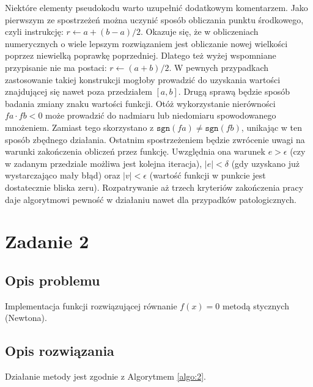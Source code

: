 \documentclass{classrep}
\begin{document}
		Niektóre elementy pseudokodu warto uzupełnić dodatkowym komentarzem. Jako pierwszym ze spostrzeżeń można uczynić sposób obliczania punktu środkowego, czyli instrukcję: $r \leftarrow a+(b-a)/2$. Okazuje się, że w obliczeniach numerycznych o wiele lepszym rozwiązaniem jest obliczanie nowej wielkości poprzez niewielką poprawkę poprzedniej. Dlatego też wyżej wspomniane przypisanie nie ma postaci: $r \leftarrow (a+b)/2$. W pewnych przypadkach zastosowanie takiej konstrukcji mogłoby prowadzić do uzyskania wartości znajdującej się nawet poza przedziałem $[a,b]$.
		Drugą sprawą będzie sposób badania zmiany znaku wartości funkcji. Otóż wykorzystanie nierówności $fa\cdot fb < 0$ może prowadzić do nadmiaru lub niedomiaru spowodowanego mnożeniem. Zamiast tego skorzystano z $\texttt{sgn}(fa) \neq \texttt{sgn}(fb)$, unikając w ten sposób zbędnego działania.
		Ostatnim spostrzeżeniem będzie zwrócenie uwagi na warunki zakończenia obliczeń przez funkcję. Uwzględnia ona warunek $e > \epsilon$ (czy w zadanym przedziale możliwa jest kolejna iteracja), $|e| < \delta$ (gdy uzyskano już wystarczająco mały błąd) oraz $|v| < \epsilon$ (wartość funkcji w punkcie jest dostatecznie bliska zeru). Rozpatrywanie aż trzech kryteriów zakończenia pracy daje algorytmowi pewność w działaniu nawet dla przypadków patologicznych.
	
\section{Zadanie 2}
	\subsection{Opis problemu}
		Implementacja funkcji rozwiązującej równanie $f(x)=0$ metodą stycznych (Newtona).
		
	\subsection{Opis rozwiązania}	
		Działanie metody jest zgodnie z Algorytmem \ref{algo:2}.
	
\end{document}
